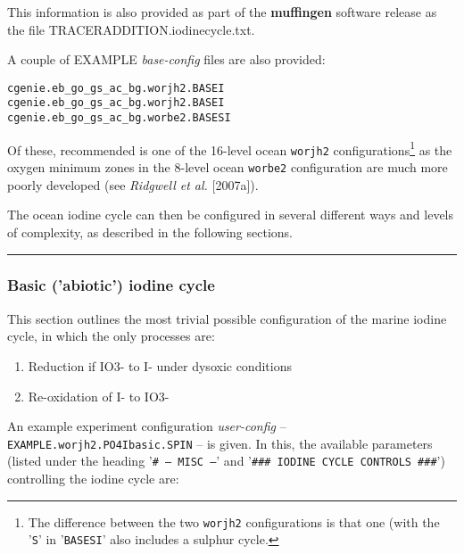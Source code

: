 This information is also provided as part of the \textbf{muffingen} software release as the file \textsf{\footnotesize TRACERADDITION.iodinecycle.txt}.

A couple of EXAMPLE \textit{base-config} files are also provided:
\vspace{-1mm}\small\begin{verbatim}
cgenie.eb_go_gs_ac_bg.worjh2.BASEI
cgenie.eb_go_gs_ac_bg.worjh2.BASEI
cgenie.eb_go_gs_ac_bg.worbe2.BASESI
\end{verbatim}\normalsize\vspace{-1mm}
Of these, recommended is one of the 16-level ocean \texttt{worjh2} configurations\footnote{The difference between the two \texttt{worjh2} configurations is that one (with the '\texttt{S}' in '\texttt{BASESI}' also includes a sulphur cycle.} as the oxygen minimum zones in the 8-level ocean \texttt{worbe2} configuration are much more poorly developed (see \textit{Ridgwell et al.} [2007a]).

The ocean iodine cycle can then be configured in several different ways and levels of complexity, as described in the following sections.

%
\noindent\rule{4cm}{0.5pt}
\subsubsection{Basic ('abiotic') iodine cycle}
\vspace{1mm}

This section outlines the most trivial possible configuration of the marine iodine cycle, in which the only processes are:
\begin{enumerate}[noitemsep]
\vspace{1mm}
\item Reduction if IO3- to I- under dysoxic conditions
\vspace{1mm}
\item Re-oxidation of I- to IO3-
\end{enumerate}
\vspace{1mm}

\noindent An example experiment configuration \textit{user-config} -- \texttt{EXAMPLE.worjh2.PO4Ibasic.SPIN} -- is given. In this, the available parameters (listed under the heading '\texttt{\# --- MISC ---}' and '\texttt{\#\#\# IODINE CYCLE CONTROLS \#\#\#}') controlling the iodine cycle are:

